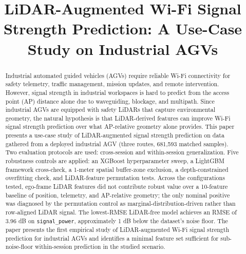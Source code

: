 \documentclass[conference]{IEEEtran}
\begin{document}
\title{LiDAR-Augmented Wi\nobreakdash-Fi Signal Strength Prediction: A Use-Case Study on Industrial AGVs}

\author{%
}

\maketitle

\begin{abstract}
Industrial automated guided vehicles (AGVs) require reliable Wi\nobreakdash-Fi connectivity for safety telemetry, traffic management, mission updates, and remote intervention. However, signal strength in industrial workspaces is hard to predict from the access point (AP) distance alone due to waveguiding, blockage, and multipath. Since industrial AGVs are equipped with safety LiDARs that capture environmental geometry, the natural hypothesis is that LiDAR-derived features can improve Wi\nobreakdash-Fi signal strength prediction over what AP-relative geometry alone provides. This paper presents a use-case study of LiDAR-augmented signal strength prediction on data gathered from a deployed industrial AGV (three routes, 681,593 matched samples). Two evaluation protocols are used: cross-session and within-session generalization. Five robustness controls are applied: an XGBoost hyperparameter sweep, a LightGBM framework cross-check, a 1-meter spatial buffer-zone exclusion, a depth-constrained overfitting check, and LiDAR-feature permutation tests. Across the configurations tested, ego-frame LiDAR features did not contribute robust value over a 10-feature baseline of position, telemetry, and AP-relative geometry; the only nominal positive was diagnosed by the permutation control as marginal-distribution-driven rather than row-aligned LiDAR signal. The lowest-RMSE LiDAR-free model achieves an RMSE of 3.96 dB on \texttt{signal\_power}, approximately 1 dB below the dataset's noise floor. The paper presents the first empirical study of LiDAR-augmented Wi\nobreakdash-Fi signal strength prediction for industrial AGVs and identifies a minimal feature set sufficient for sub-noise-floor within-session prediction in the studied scenario.
\end{abstract}
\end{document}
